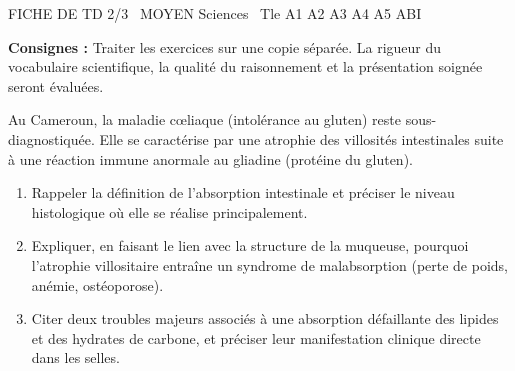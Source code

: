 \documentclass[11pt]{article}
\begin{document}
\begin{tcolorbox}[enhanced,colback=popink,colframe=popink,arc=10pt,boxrule=0pt,left=12pt,right=12pt,top=9pt,bottom=9pt]
{\color{white}\popxbold\small FICHE DE TD 2/3 \textbullet\ MOYEN \hfill Sciences \textbullet\ Tle A1 A2 A3 A4 A5 ABI\par}
\end{tcolorbox}
\vspace{4pt}
\noindent\textbf{Consignes :} Traiter les exercices sur une copie séparée. La rigueur du vocabulaire scientifique, la qualité du raisonnement et la présentation soignée seront évaluées.

\begin{exercice}
Au Cameroun, la maladie cœliaque (intolérance au gluten) reste sous-diagnostiquée. Elle se caractérise par une atrophie des villosités intestinales suite à une réaction immune anormale au gliadine (protéine du gluten).
\begin{enumerate}
    \item Rappeler la définition de l'absorption intestinale et préciser le niveau histologique où elle se réalise principalement.
    \item Expliquer, en faisant le lien avec la structure de la muqueuse, pourquoi l'atrophie villositaire entraîne un syndrome de malabsorption (perte de poids, anémie, ostéoporose).
    \item Citer deux troubles majeurs associés à une absorption défaillante des lipides et des hydrates de carbone, et préciser leur manifestation clinique directe dans les selles.
\end{enumerate}
\end{exercice}
\end{document}
